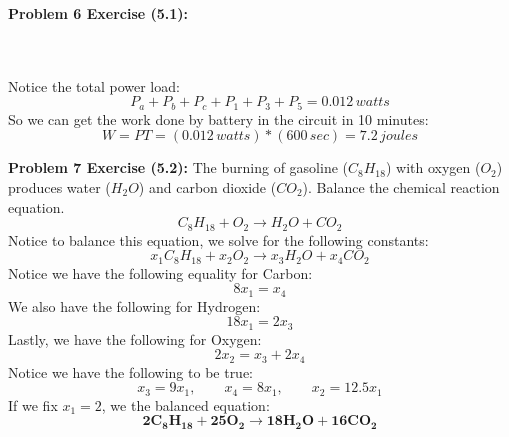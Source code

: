 \documentclass[11pt]{article}
\newenvironment{problem}[1]{\textbf{Problem #1: }}{\newpage}
\begin{document}
\begin{problem}{6 Exercise (5.1)}
\begin{enumerate}[label = (\alph*)]
			\\ \\
			Notice the total power load:
			\[P_a + P_b + P_c + P_1 + P_3 + P_5 = 0.012\,watts\]
			So we can get the work done by battery in the circuit in 10 minutes:
			\[W = PT = (0.012\,watts) * (600\,sec) = 7.2\,joules\]
		\end{enumerate}
	\end{problem}


	\begin{problem}{7 Exercise (5.2)}
		The burning of gasoline ($C_8H_{18}$) with oxygen ($O_2$) produces water ($H_2O$) and carbon dioxide ($CO_2$). Balance the chemical reaction equation.
		\[C_8H_{18} + O_2 \rightarrow H_2O + CO_2\]
		Notice to balance this equation, we solve for the following constants:
		\[x_1C_8H_{18} + x_2O_2 \rightarrow x_3H_2O + x_4CO_2\]
		Notice we have the following equality for Carbon:
		\[8x_1 = x_4\]
		We also have the following for Hydrogen:
		\[18x_1 = 2x_3\]
		Lastly, we have the following for Oxygen:
		\[2x_2 = x_3 + 2x_4\]
		Notice we have the following to be true:
		\[x_3 = 9x_1, \qquad x_4 = 8x_1, \qquad x_2 = 12.5x_1\]
		If we fix $x_1 = 2$, we the balanced equation:
		\[\boldsymbol{2C_8H_{18} + 25 O_2 \rightarrow 18 H_2O + 16CO_2}\]
	\end{problem}
\end{document}
